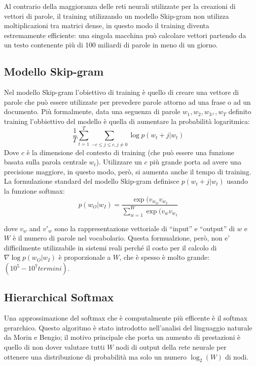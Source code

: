 \documentclass[a4paper,12pt,openright,twoside]{report}
\theoremstyle{definition}
\begin{document}
Al contrario della maggioranza delle reti neurali utilizzate per la creazioni di vettori di parole, 
il training utilizzando un modello Skip-gram non utilizza moltiplicazioni tra matrici dense,
in questo modo il training diventa estremamente efficiente: una singola macchina può calcolare vettori
partendo da un testo contenente più di 100 miliardi di parole in meno di un giorno.

\subsection{Modello Skip-gram}
Nel modello Skip-gram l'obiettivo di training è quello di creare una vettore di parole che
può essere utilizzate per prevedere parole attorno ad una frase o ad un documento. Più formalmente,
data una seguenza di parole $w_1,w_2,w_3,\dot{},w_T$ definito training l'obbiettivo del modello è quella di aumentare la
probabilità logaritmica:
\begin{equation}
	\frac{1}{T} \sum_{t=1}^{T} \sum_{-c\leq j\leq c,j\neq0} \log p(w_t+j|w_t)
	\label{eq:prob log}
\end{equation}
Dove $c$ è la dimensione del contesto di training (che può essere una funzione basata sulla parola centrale $w_t$).
Utilizzare un $c$ più grande porta ad avere una precisione maggiore, in questo modo, però, si aumenta anche il 
tempo di training. La formulazione standard del modello Skip-gram definisce $p(w_t+j|w_t)$ usando la funzione
softmax:
\begin{equation}
	p(w_O|w_I) = \frac{\exp(v_{w_O} v_{w_I}}{\sum_{w=1}^{W}\exp(v_w v_{w_I}}
	\label{eq:softmax}
\end{equation}

dove $v_w$ and $v'_w$ sono la rappresentazione vettoriale di ``input'' e ``output'' di $w$ e $W$ è il numero
di parole nel vocabolario.
Questa formualzione, però, non e' difficilmente utilizzabile in sistemi reali
perché il costo per il calcolo di $\nabla\log p(w_O|w_I)$
è proporzionale a $W$, che è spesso è molto grande: $(10^5-10^7 termini)$.

\subsection{Hierarchical Softmax}
Una approssimazione del softmax che è computalmente più efficente è il softmax gerarchico. Questo algoritmo
è stato introdotto nell'analisi del linguaggio naturale da Morin e Bengio; il motivo principale
che porta un aumento di prestazioni
è quello di non dover valutare tutti $W$ nodi di output della rete neurale per ottenere una distribuzione
di probabilità ma solo un numero $\log_2(W)$ di nodi.
\end{document}
